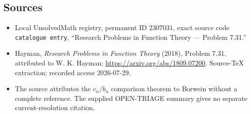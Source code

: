 \documentclass[11pt]{article}
\begin{document}
\subsection{Sources}
\begin{itemize}
\item Local UnsolvedMath registry, permanent ID \(2307031\), exact source code \texttt{catalogue entry}, ``Research Problems in Function Theory --- Problem 7.31.''
\item Hayman, \emph{Research Problems in Function Theory} (2018), Problem 7.31, attributed to W. K. Hayman; \url{https://arxiv.org/abs/1809.07200}. Source-TeX extraction; recorded access 2026-07-29.
\item The source attributes the \(c_n/b_n\) comparison theorem to Borwein without a complete reference. The supplied OPEN-TRIAGE summary gives no separate current-resolution citation.
\end{itemize}
\end{document}
